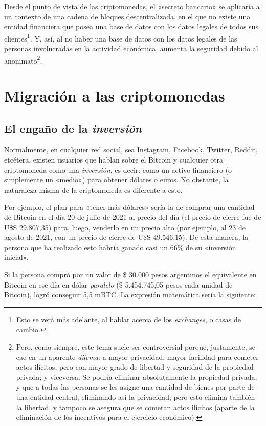 \documentclass[12pt,a4paper,twoside]{book}
\begin{document}
Desde el punto de vista de las criptomonedas, el «secreto bancario» se aplicaría a un contexto de una cadena de bloques descentralizada, en el que no existe una entidad financiera que posea una base de datos con los datos legales de todos sus clientes\footnote{Esto se verá más adelante, al hablar acerca de los \textit{exchanges}, o casas de cambio.}. Y, así, al no haber una base de datos con los datos legales de las personas involucradas en la actividad económica, aumenta la seguridad debido al anonimato\footnote{Pero, como siempre, este tema suele ser controversial porque, justamente, se cae en un aparente \textit{dilema}: a mayor privacidad, mayor facilidad para cometer actos ilícitos, pero con mayor grado de libertad y seguridad de la propiedad privada; y viceversa. Se podría eliminar absolutamente la propiedad privada, y que a todas las personas se les asigne una cantidad de bienes por parte de una entidad central, eliminando así la privacidad; pero esto elimina también la libertad, y tampoco se asegura que se cometan actos ilícitos (aparte de la eliminación de los incentivos para el ejercicio económico).}.

\chapter{Migración a las criptomonedas}
\section{El engaño de la \textit{inversión}}
Normalmente, en cualquier red social, sea Instagram, Facebook, Twitter, Reddit, etcétera, existen usuarios que hablan sobre el Bitcoin y cualquier otra criptomoneda como una \textit{inversión}, es decir: como un activo financiero (o simplemente un «medio») para obtener dólares o euros. No obstante, la naturaleza misma de la criptomoneda es diferente a esto.

Por ejemplo, el plan para «tener más dólares» sería la de comprar una cantidad de Bitcoin en el día 20 de julio de 2021 al precio del día (el precio de cierre fue de U\$S 29.807,35) para, luego, venderlo en un precio alto (por ejemplo, al 23 de agosto de 2021, con un precio de cierre de U\$S 49.546,15). De esta manera, la persona que ha realizado esto habría ganado casi un 66\% de su «inversión inicial». 

Si la persona compró por un valor de \$ 30.000 pesos argentinos el equivalente en Bitcoin en ese día en dólar \textit{paralelo} (\$ 5.454.745,05 pesos cada unidad de Bitcoin), logró conseguir 5,5 mBTC. La expresión matemática sería la siguiente:
\end{document}
